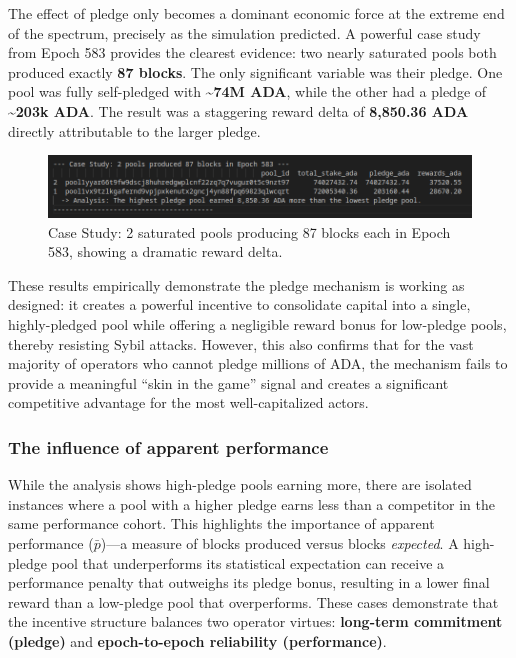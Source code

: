 \documentclass[11pt, letterpaper]{article}
\begin{document}
The effect of pledge only becomes a dominant economic force at the extreme end
of the spectrum, precisely as the simulation predicted. A powerful case study
from Epoch 583 provides the clearest evidence: two nearly saturated pools both
produced exactly \textbf{87 blocks}. The only significant variable was their
pledge. One pool was fully self-pledged with \textbf{\textasciitilde74M ADA},
while the other had a pledge of \textbf{\textasciitilde203k ADA}. The result
was a staggering reward delta of \textbf{8,850.36 ADA} directly attributable to
the larger pledge.

\begin{figure}[H]
	\centering
	\includegraphics[width=\textwidth]{img/87blocks-e584.png}
	\caption{Case Study: 2 saturated pools producing 87 blocks each in Epoch 583, showing a dramatic reward delta.}
	\label{fig:87blocks-e584}
\end{figure}

These results empirically demonstrate the pledge mechanism is working as designed: it creates
a powerful incentive to consolidate capital into a single, highly-pledged pool while offering a
negligible reward bonus for low-pledge pools, thereby resisting Sybil attacks. However, this
also confirms that for the vast majority of operators who cannot pledge millions of ADA, the
mechanism fails to provide a meaningful ``skin in the game'' signal and creates
a significant competitive advantage for the most well-capitalized actors.

\subsubsection{The influence of apparent performance}
While the analysis shows high-pledge pools earning more, there are isolated
instances where a pool with a higher pledge earns less than a competitor in the
same performance cohort. This highlights the importance of apparent performance
($\bar{p}$)—a measure of blocks produced versus blocks \textit{expected}. A
high-pledge pool that underperforms its statistical expectation can receive a
performance penalty that outweighs its pledge bonus, resulting in a lower final
reward than a low-pledge pool that overperforms. These cases demonstrate that
the incentive structure balances two operator virtues: \textbf{long-term commitment (pledge)}
and \textbf{epoch-to-epoch reliability (performance)}.
\end{document}
